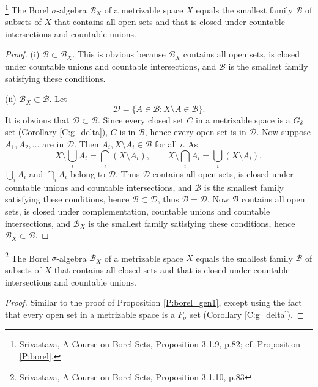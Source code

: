 \begin{proposition} \label{P:borel_gen1}
\footnote{Srivastava, A Course on Borel Sets, Proposition 3.1.9, p.82;
  cf. Proposition \ref{P:borel}. }
The Borel $\sigma$-algebra $\mathcal{B}_X$ of a metrizable space $X$ equals the
smallest family $\mathcal{B}$ of subsets of $X$ that contains all open sets and
that is closed under countable intersections and countable unions.
\end{proposition}
\begin{proof}
(i) $\mathcal{B}\subset\mathcal{B}_X$. This is obvious because 
$\mathcal{B}_X$ contains all open sets, is closed under countable unions and 
countable intersections, and $\mathcal{B}$ is the smallest family satisfying 
these conditions.

(ii) $\mathcal{B}_X\subset\mathcal{B}$. Let
\[
	\mathcal{D} = \{ A\in\mathcal{B}: X\setminus A\in\mathcal{B} \}.
\]
It is obvious that $\mathcal{D}\subset\mathcal{B}$.
Since every closed set $C$ in a metrizable space is a $G_{\delta}$ set (Corollary 
\ref{C:g_delta}), $C$ is in $\mathcal{B}$, hence every open set is in
$\mathcal{D}$. Now suppose $A_1,A_2,\dots$ are in $\mathcal{D}$. Then
$A_i,X\setminus A_i\in\mathcal{B}$ for all $i$. As
\[
	X\setminus\bigcup_i A_i = \bigcap_i (X\setminus A_i), \qquad
	X\setminus\bigcap_i A_i = \bigcup_i (X\setminus A_i),
\]
$\bigcup_i A_i$ and $\bigcap_i A_i$ belong to $\mathcal{D}$. Thus 
$\mathcal{D}$ contains all open sets, is closed under countable unions and 
countable intersections, and $\mathcal{B}$ is the smallest family satisfying 
these conditions, hence $\mathcal{B}\subset\mathcal{D}$, thus 
$\mathcal{B}=\mathcal{D}$.
Now $\mathcal{B}$ contains all open sets, is closed under complementation,
countable unions and countable intersections, and $\mathcal{B}_X$ is the smallest 
family satisfying these conditions, hence $\mathcal{B}_X\subset\mathcal{B}$.
\end{proof}

\begin{proposition} \label{P:borel_gen2}
\footnote{Srivastava, A Course on Borel Sets, Proposition 3.1.10, p.83}
The Borel $\sigma$-algebra $\mathcal{B}_X$ of a metrizable space $X$ equals the
smallest family $\mathcal{B}$ of subsets of $X$ that contains all closed sets and
that is closed under countable intersections and countable unions.
\end{proposition}
\begin{proof}
Similar to the proof of Proposition \ref{P:borel_gen1}, except using the fact
that every open set in a metrizable space is a $F_{\sigma}$ set (Corollary 
\ref{C:g_delta}). 
\end{proof}

